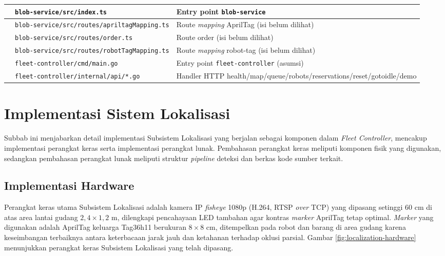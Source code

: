 \begin{xltabular}{\textwidth}{ | >{\raggedright\arraybackslash}p{1.5cm} | >{\raggedright\arraybackslash}p{6.5cm} | >{\raggedright\arraybackslash}X | }
     & \texttt{blob-service/\allowbreak src/\allowbreak index.ts} & Entry point \texttt{blob-service} \\
     & \texttt{blob-service/\allowbreak src/\allowbreak routes/\allowbreak apriltagMapping.ts} & Route \textit{mapping} AprilTag (isi belum dilihat) \\
     & \texttt{blob-service/\allowbreak src/\allowbreak routes/\allowbreak order.ts} & Route order (isi belum dilihat) \\
     & \texttt{blob-service/\allowbreak src/\allowbreak routes/\allowbreak robotTagMapping.ts} & Route \textit{mapping} robot-tag (isi belum dilihat) \\
     & \texttt{fleet-controller/\allowbreak cmd/\allowbreak main.go} & Entry point \texttt{fleet-controller} (asumsi) \\
     & \texttt{fleet-controller/\allowbreak internal/\allowbreak api/*.go} & Handler HTTP health/\allowbreak map/\allowbreak queue/\allowbreak robots/\allowbreak reservations/\allowbreak reset/\allowbreak gotoidle/\allowbreak demo \\
    \hline
\end{xltabular}

\section{Implementasi Sistem Lokalisasi}
Subbab ini menjabarkan detail implementasi Subsistem Lokalisasi yang berjalan sebagai komponen dalam \textit{Fleet Controller}, mencakup implementasi perangkat keras serta implementasi perangkat lunak. Pembahasan perangkat keras meliputi komponen fisik yang digunakan, sedangkan pembahasan perangkat lunak meliputi struktur \textit{pipeline} deteksi dan berkas kode sumber terkait.

\subsection{Implementasi Hardware}
Perangkat keras utama Subsistem Lokalisasi adalah kamera IP \textit{fisheye} 1080p (H.264, RTSP \textit{over} TCP) yang dipasang setinggi 60 cm di atas area lantai gudang $2,4 \times 1,2$ m, dilengkapi pencahayaan LED tambahan agar kontras \textit{marker} AprilTag tetap optimal. \textit{Marker} yang digunakan adalah AprilTag keluarga Tag36h11 berukuran $8 \times 8$ cm, ditempelkan pada robot dan barang di area gudang karena keseimbangan terbaiknya antara keterbacaan jarak jauh dan ketahanan terhadap oklusi parsial. Gambar \ref{fig:localization-hardware} menunjukkan perangkat keras Subsistem Lokalisasi yang telah dipasang.

